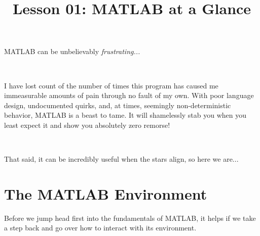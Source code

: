 \documentclass{article}
\title{Lesson 01: MATLAB at a Glance}
\begin{document}
\renderTitle

\noindent
MATLAB can be unbelievably \emph{frustrating...}

\

\noindent
I have lost count of the number of times this program has caused me
immeasurable amounts of pain through no fault of my own. With poor
language design, undocumented quirks, and, at times, seemingly
non-deterministic behavior, MATLAB is a beast to tame.  It will
shamelessly stab you when you least expect it and show you absolutely
zero remorse!

\

\noindent
That said, it can be incredibly useful when the stars align, so here we
are...

\section{The MATLAB Environment}

Before we jump head first into the fundamentals of MATLAB, it helps if
we take a step back and go over how to interact with its environment.
\end{document}
